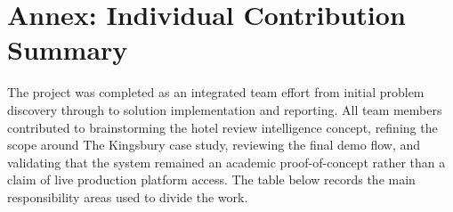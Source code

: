 \documentclass[11pt,a4paper]{article}
\begin{document}
\appendix
\section{Annex: Individual Contribution Summary}
\label{annex:contributions}

The project was completed as an integrated team effort from initial problem discovery through to
solution implementation and reporting. All team members contributed to brainstorming the hotel review
intelligence concept, refining the scope around The Kingsbury case study, reviewing the final demo
flow, and validating that the system remained an academic proof-of-concept rather than a claim of live
production platform access. The table below records the main responsibility areas used to divide the
work.
\end{document}
